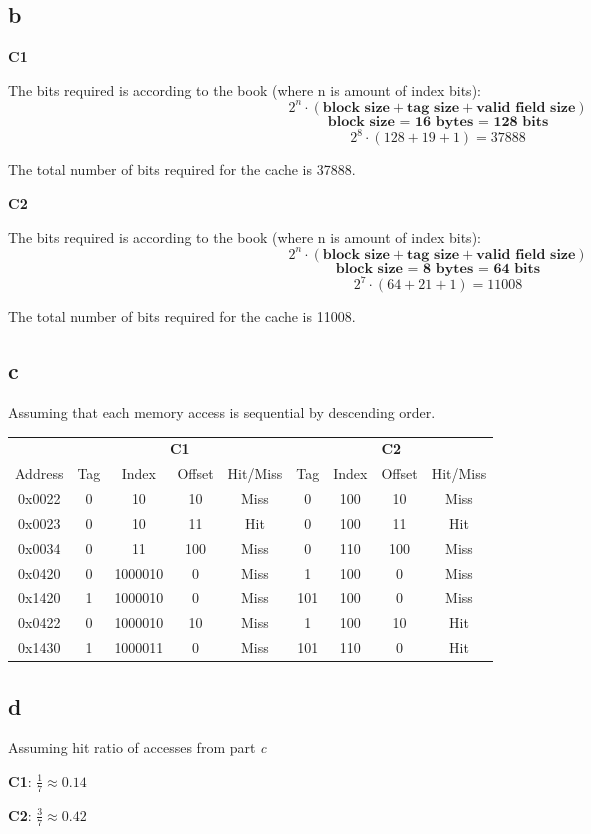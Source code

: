 \subsection*{b}

\textbf{C1}

The bits required is according to the book (where n is amount of index bits):
$$ 2^n \cdot (\textbf{block size} + \textbf{tag size} + \textbf{valid field size}) $$
$$ \textbf{block size = 16 bytes = 128 bits} $$
$$ 2^8 \cdot (128 + 19 + 1) = 37888 $$

The total number of bits required for the cache is 37888.

\textbf{C2}

The bits required is according to the book (where n is amount of index bits):
$$ 2^n \cdot (\textbf{block size} + \textbf{tag size} + \textbf{valid field size}) $$
$$ \textbf{block size = 8 bytes = 64 bits} $$
$$ 2^7 \cdot (64 + 21 + 1) = 11008 $$

The total number of bits required for the cache is 11008.

\subsection*{c}

Assuming that each memory access is sequential by descending order.

\begin{center}
    \begin{tabular}{c | c  c  c  c | c  c  c  c }
        & \multicolumn{4}{c}{\textbf{C1}} & \multicolumn{4}{c}{\textbf{C2}} \\
        \cline{1-4} 
        \cline{4-9}
        Address & Tag & Index & Offset & Hit/Miss & Tag & Index & Offset & Hit/Miss \\
        0x0022 & 0 & 10 & 10 & Miss & 0 & 100 & 10 & Miss \\
        0x0023 & 0 & 10 & 11 & Hit & 0 & 100 & 11 & Hit \\
        0x0034 & 0 & 11 & 100 & Miss & 0 & 110 & 100 & Miss \\
        0x0420 & 0 & 1000010 & 0 & Miss & 1 & 100 & 0 & Miss \\
        0x1420 & 1 & 1000010 & 0 & Miss & 101 & 100 & 0 & Miss \\
        0x0422 & 0 & 1000010 & 10 & Miss & 1 & 100 & 10 & Hit \\
        0x1430 & 1 & 1000011 & 0 & Miss & 101 & 110 & 0 & Hit \\
    \end{tabular}
\end{center}

\subsection*{d}
Assuming hit ratio of accesses from part \textit{c}

\textbf{C1}: $\frac{1}{7} \approx 0.14$

\textbf{C2}: $\frac{3}{7} \approx 0.42$

\newpage